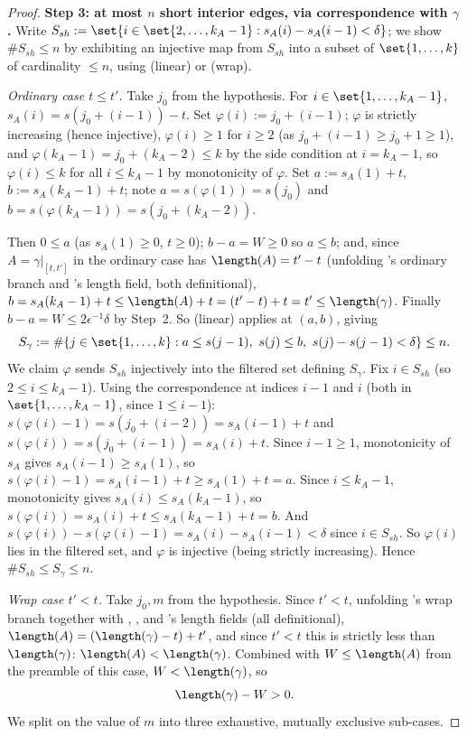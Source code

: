 \begin{proof}
  \textbf{Step 3: at most $n$ short interior edges, via correspondence with $\gamma$.} Write
  $S_{sh} := \set{i\in\set{2,\dots,k_A-1} : s_A(i)-s_A(i-1)<\delta}$; we show $\#S_{sh}\le n$ by
  exhibiting an injective map from $S_{sh}$ into a subset of $\set{1,\dots,k}$ of cardinality
  $\le n$, using (linear) or (wrap).

  \emph{Ordinary case $t\le t'$.} Take $j_0$ from the hypothesis. For $i\in\set{1,\dots,k_A-1}$,
  $s_A(i)=s(j_0+(i-1))-t$. Set $\varphi(i):=j_0+(i-1)$; $\varphi$ is strictly increasing
  (hence injective), $\varphi(i)\ge1$ for $i\ge2$ (as $j_0+(i-1)\ge j_0+1\ge1$), and
  $\varphi(k_A-1)=j_0+(k_A-2)\le k$ by the side condition at $i=k_A-1$, so $\varphi(i)\le k$ for
  all $i\le k_A-1$ by monotonicity of $\varphi$. Set $a:=s_A(1)+t$, $b:=s_A(k_A-1)+t$; note
  $a=s(\varphi(1))=s(j_0)$ and $b=s(\varphi(k_A-1))=s(j_0+(k_A-2))$.

  Then $0\le a$ (as $s_A(1)\ge0$, $t\ge0$); $b-a=W\ge0$ so $a\le b$; and, since $A=\gamma|_{[t,t']}$
  in the ordinary case has $\length(A)=t'-t$ (unfolding 's ordinary branch and
  's length field, both definitional),
  $b=s_A(k_A-1)+t\le\length(A)+t=(t'-t)+t=t'\le\length(\gamma)$. Finally $b-a=W\le2\epsilon^{-1}\delta$
  by Step~2. So (linear) applies at $(a,b)$, giving
  \[
    S_\gamma := \#\{j\in\set{1,\dots,k} : a\le s(j-1),\ s(j)\le b,\ s(j)-s(j-1)<\delta\} \le n
    .
  \]
  We claim $\varphi$ sends $S_{sh}$ injectively into the filtered set defining $S_\gamma$. Fix
  $i\in S_{sh}$ (so $2\le i\le k_A-1$). Using the correspondence at indices $i-1$ and $i$ (both in
  $\set{1,\dots,k_A-1}$, since $1\le i-1$): $s(\varphi(i)-1)=s(j_0+(i-2))=s_A(i-1)+t$ and
  $s(\varphi(i))=s(j_0+(i-1))=s_A(i)+t$. Since $i-1\ge1$, monotonicity of $s_A$ gives
  $s_A(i-1)\ge s_A(1)$, so $s(\varphi(i)-1)=s_A(i-1)+t\ge s_A(1)+t=a$. Since $i\le k_A-1$,
  monotonicity gives $s_A(i)\le s_A(k_A-1)$, so $s(\varphi(i))=s_A(i)+t\le s_A(k_A-1)+t=b$. And
  $s(\varphi(i))-s(\varphi(i)-1)=s_A(i)-s_A(i-1)<\delta$ since $i\in S_{sh}$. So $\varphi(i)$ lies
  in the filtered set, and $\varphi$ is injective (being strictly increasing). Hence
  $\#S_{sh}\le S_\gamma\le n$.

  \emph{Wrap case $t'<t$.} Take $j_0,m$ from the hypothesis. Since $t'<t$, unfolding
  's wrap branch together with ,
  , and 's length fields (all definitional),
  $\length(A)=(\length(\gamma)-t)+t'$, and since $t'<t$ this is strictly less than
  $\length(\gamma)$: $\length(A)<\length(\gamma)$. Combined with $W\le\length(A)$ from the
  preamble of this case, $W<\length(\gamma)$, so
  \begin{equation}\label{ASWEC-margin}
    \length(\gamma)-W>0
    .
  \end{equation}
  We split on the value of $m$ into three exhaustive, mutually exclusive sub-cases.


\end{proof}
